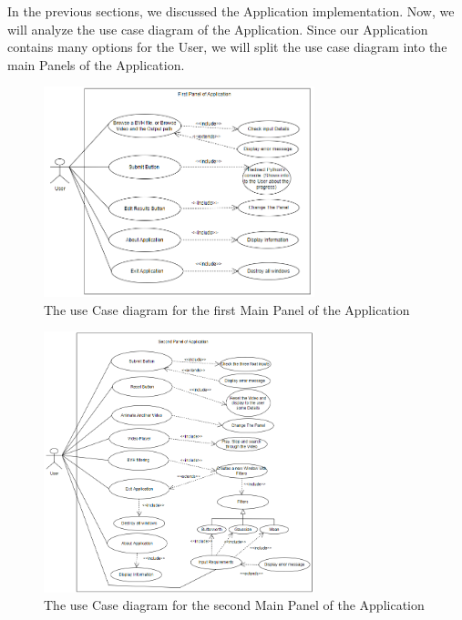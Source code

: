 In the previous sections, we discussed the Application implementation. Now, we will analyze the use case diagram of the Application. Since our Application contains many options for the User, we will split the use case diagram into the main Panels of the Application. 

\begin{figure}[h]
	\centering
	\includegraphics[width=0.7\textwidth]{figures/Implementation/UseCase1.png}
	\captionsetup{labelformat=empty}
	\caption{The use Case diagram for the first Main Panel of the Application}
\end{figure}

\pagebreak

\begin{figure}[h]
	\centering
	\includegraphics[width=0.7\textwidth]{figures/Implementation/UseCase2.png}
	\captionsetup{labelformat=empty}
	\caption{The use Case diagram for the second Main Panel of the Application}
\end{figure}